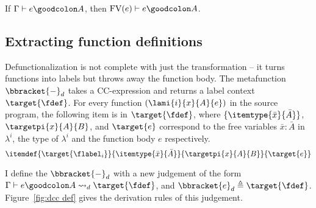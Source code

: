 \begin{lemma}If $\Gamma \vdash e \goodcolon A$, then $\text{FV}(e) \vdash e \goodcolon A$.
\label{lem:fv}
\end{lemma}


\subsection{Extracting function definitions}

Defunctionalization is not complete with just the transformation -- it turns functions into labels but throws away the function body. The metafunction $\bbracket{-}_d$ takes a CC-expression and returns a label context $\target{\fdef}$.
For every function $(\lami{i}{x}{A}{e})$ in the source program, the following item is in $\target{\fdef}$, where $\{\itemtype{\bar{x}}{\bar{A}}\}$, $\targetpi{x}{A}{B}$, and $\target{e}$ correspond to the free variables $\bar{x} \mathrel{:} \bar{A}$ in $\lambda^i$, the type of $\lambda^i$ and the function body $e$ respectively.
\begin{equation*}
	\itemdef{\target{\flabel_i}}{\itemtype{\bar{x}}{\bar{A}}}{\targetpi{x}{A}{B}}{\target{e}}
\end{equation*}

I define the $\bbracket{-}_d$ with a new judgement of the form $\Gamma \vdash e \goodcolon A \leadsto_d \target{\fdef}$, and $\bbracket{e}_d \triangleq \target{\fdef}$. Figure~\ref{fig:dcc def} gives the derivation rules of this judgement.

